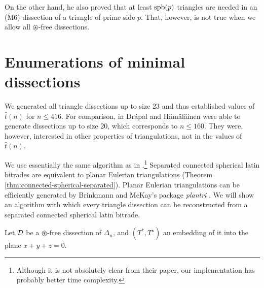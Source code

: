 On the other hand, he also proved that at least $\mathop{\mathrm{spb}}(p)$ triangles are needed in an (M6) dissection of a triangle of prime side $p$. That, however, is not true when we allow all $\circledast$-free dissections.


\section{Enumerations of minimal dissections}

We generated all triangle dissections up to size 23 and thus established values of $\hat t(n)$ for $n \leq 416$. For comparison, in \cite{DrapalHamalainen10} Drápal and Hämäläinen were able to generate dissections up to size 20, which corresponds to $n \leq 160$. They were, however, interested in other properties of triangulations, not in the values of $\hat t(n)$.

We use essentially the same algorithm as in \cite{DrapalHamalainen10}.\footnote{Although it is not absolutely clear from their paper, our implementation has probably better time complexity.} Separated connected spherical latin bitrades are equivalent to planar Eulerian triangulations (Theorem \ref{thm:connected-spherical-separated}). Planar Eulerian triangulations can be efficiently generated by Brinkmann and McKay's package \emph{plantri} \cite{BrinkmannMcKay99}. We will show an algorithm with which every triangle dissection can be reconstructed from a separated connected spherical latin bitrade.

\bigskip

Let $\mathcal D$ be a $\circledast$-free dissection of $\Delta_n$, and $(T^*, T^\vartriangle)$ an embedding of it into the plane $x+y+z=0$.

